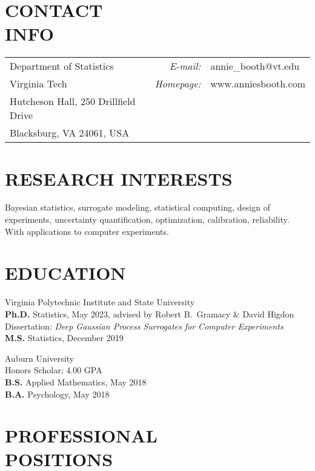 \documentclass[margin,line,11pt]{res}
\begin{document}

\begin{resume}


\vspace{-0.1cm}
\section{\bf CONTACT\\INFO}
\vspace{.05in}
\begin{tabular}{@{}p{2.7in}rp{2in}}
Department of Statistics  & {\it E-mail:} & annie\_booth@vt.edu \\            
Virginia Tech & {\it Homepage:} & www.anniesbooth.com \\   
Hutcheson Hall, 250 Drillfield Drive \\     
Blacksburg, VA 24061, USA  
\end{tabular}

\medskip
\section{\bf RESEARCH INTERESTS}

Bayesian statistics, surrogate modeling, statistical computing, design of experiments, 
uncertainty quantification, optimization, calibration, reliability.  
With applications to computer experiments.

\medskip
\section{\bf EDUCATION}

{\sc Virginia Polytechnic Institute and State University} \\
{\bf Ph.D.} Statistics, May 2023, advised by Robert B.~Gramacy \& David Higdon \\
Dissertation: {\it Deep Gaussian Process Surrogates for Computer Experiments} \\
{\bf M.S.} Statistics, December 2019 

{\sc Auburn University} \\
Honors Scholar; 4.00 GPA \\
{\bf B.S.} Applied Mathematics, May 2018 \\
{\bf B.A.} Psychology, May 2018

\medskip
\section{\bf PROFESSIONAL \\ POSITIONS}


\end{resume}
\end{document}
